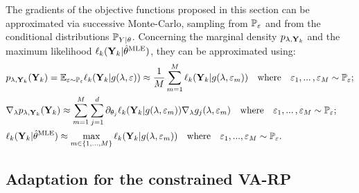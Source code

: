 The gradients of the objective functions proposed in this section can be approximated via successive Monte-Carlo, sampling from $\mathbb{P}_\varepsilon$ and from the conditional distributions $\mathbb{P}_{Y|\theta}$.
Concerning the marginal density $p_{\lambda,\mathbf{Y}_k}$ and the maximum likelihood $\ell_k(\mathbf{Y}_k|\hat\theta^{\text{MLE}})$, they can be approximated using:
\begin{equation}\label{eq:MCgradI}
    \begin{aligned} \displaystyle
        & p_{\lambda,\mbf Y_k}(\mbf Y_k) =\EE_{\eps\sim\PP_\eps}\ell_k(\mbf Y_k|g(\lambda,\eps)) \approx \frac{1}{M} \sum_{m=1}^M \ell_k(\mbf Y_k|  g(\lambda, \varepsilon_m)) \quad \text{where} \quad \varepsilon_1,...\,, \varepsilon_M \sim \mathbb{P}_{\varepsilon}; \\
        & \nabla_\lambda p_{\lambda,\mbf Y_k}(\mbf Y_k) %
        \approx \sum_{m=1}^M \sum_{j=1}^d\partial_{\theta_j}\ell_k(\mbf Y_k|g(\lambda,\eps_m))\nabla_\lambda g_j(\lambda,\eps_m)\quad \text{where} \quad \varepsilon_1,...\,, \varepsilon_M \sim \mathbb{P}_{\varepsilon}; \\
        & \ell_k(\mbf Y_k | \hat{\theta}^{\text{MLE}}) \approx \max_{m\in\{1,\dots,M\}} \ell_k(\mbf Y_k | g(\lambda, \varepsilon_m)) \quad \text{where} \quad \varepsilon_1,..., \varepsilon_M \sim \mathbb{P}_{\varepsilon}. 
    \end{aligned}
\end{equation}



\subsection{Adaptation for the constrained VA-RP}\label{sec:VARP:adaptconstraints}


